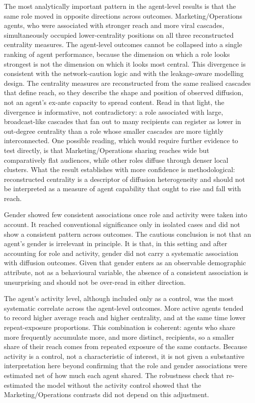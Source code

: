 The most analytically important pattern in the agent-level results is that the same role moved in opposite directions across outcomes. Marketing/Operations agents, who were associated with stronger reach and more viral cascades, simultaneously occupied lower-centrality positions on all three reconstructed centrality measures. The agent-level outcomes cannot be collapsed into a single ranking of agent performance, because the dimension on which a role looks strongest is not the dimension on which it looks most central. This divergence is consistent with the network-caution logic and with the leakage-aware modelling design. The centrality measures are reconstructed from the same realised cascades that define reach, so they describe the shape and position of observed diffusion, not an agent's ex-ante capacity to spread content. Read in that light, the divergence is informative, not contradictory: a role associated with large, broadcast-like cascades that fan out to many recipients can register as lower in out-degree centrality than a role whose smaller cascades are more tightly interconnected. One possible reading, which would require further evidence to test directly, is that Marketing/Operations sharing reaches wide but comparatively flat audiences, while other roles diffuse through denser local clusters. What the result establishes with more confidence is methodological: reconstructed centrality is a descriptor of diffusion heterogeneity and should not be interpreted as a measure of agent capability that ought to rise and fall with reach.

Gender showed few consistent associations once role and activity were taken into account. It reached conventional significance only in isolated cases and did not show a consistent pattern across outcomes. The cautious conclusion is not that an agent's gender is irrelevant in principle. It is that, in this setting and after accounting for role and activity, gender did not carry a systematic association with diffusion outcomes. Given that gender enters as an observable demographic attribute, not as a behavioural variable, the absence of a consistent association is unsurprising and should not be over-read in either direction.

The agent's activity level, although included only as a control, was the most systematic correlate across the agent-level outcomes. More active agents tended to record higher average reach and higher centrality, and at the same time lower repeat-exposure proportions. This combination is coherent: agents who share more frequently accumulate more, and more distinct, recipients, so a smaller share of their reach comes from repeated exposure of the same contacts. Because activity is a control, not a characteristic of interest, it is not given a substantive interpretation here beyond confirming that the role and gender associations were estimated net of how much each agent shared. The robustness check that re-estimated the model without the activity control showed that the Marketing/Operations contrasts did not depend on this adjustment.

